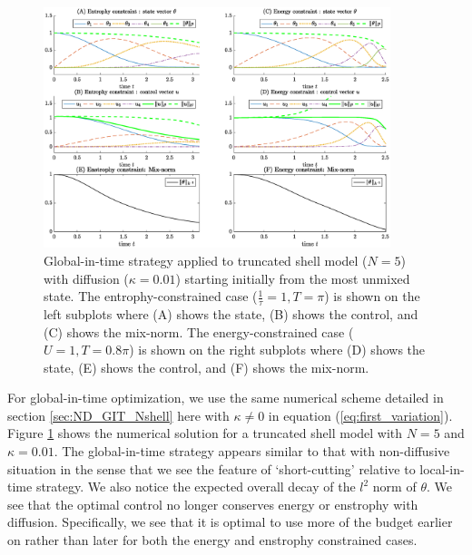 \begin{figure}[!ht]
	\centering
	\includegraphics[width=0.9\textwidth]{ch-shellmodel/images/git_diff_muic}
	\caption{Global-in-time strategy applied to truncated shell model ($N=5$) with diffusion ($\kappa=0.01$) starting initially from the most unmixed state. The entrophy-constrained case ($\frac{1}{\tau}=1, T=\pi$) is shown on the left subplots where (A) shows the state, (B) shows the control, and (C) shows the mix-norm. The energy-constrained case ($U=1,T= 0.8\pi$) is shown on the right subplots where (D) shows the state, (E) shows the control, and (F) shows the mix-norm. }
	\label{fig:git_diff_muic}
\end{figure}


For global-in-time optimization, we use the same numerical scheme detailed in section \ref{sec:ND_GIT_Nshell} here with $\kappa\neq 0$ in equation (\ref{eq:first_variation}). Figure \ref{fig:git_diff_muic} shows the numerical solution for a truncated shell model with $N=5$ and $\kappa=0.01$. The global-in-time strategy appears similar to that with non-diffusive situation in the sense that we see the feature of `short-cutting' relative to local-in-time strategy. We also notice the expected overall decay of the $l^{2}$ norm of $\theta$. We see that the optimal control no longer conserves energy or enstrophy with diffusion. Specifically, we see that it is optimal to use more of the budget earlier on rather than later for both the energy and enstrophy constrained cases.

